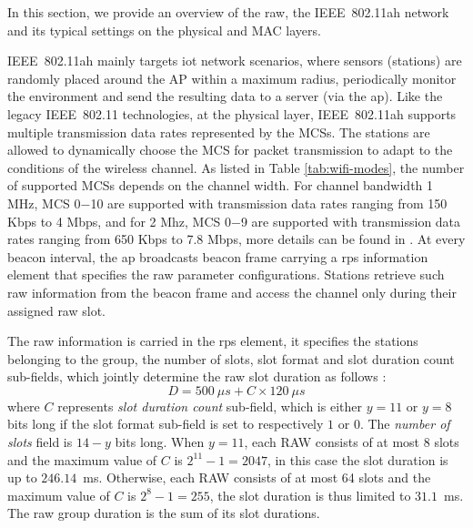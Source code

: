 In this section, we provide an overview of the \gls{raw}, the IEEE~802.11ah network and its typical settings on the physical and MAC layers. 



IEEE~802.11ah mainly targets \gls{iot} network scenarios, where sensors (stations) are randomly placed around the AP within a maximum radius, periodically monitor the environment and send the resulting data to a server (via the \gls{ap}). Like the legacy IEEE~802.11 technologies, at the physical layer, IEEE~802.11ah supports multiple transmission data rates represented by the MCSs. The stations are allowed to dynamically choose the MCS for packet transmission to adapt to the conditions of the wireless channel. As listed in Table \ref{tab:wifi-modes}, the number of supported MCSs depends on the channel width. For channel bandwidth 1 MHz,  MCS 0$-$10 are supported with transmission data rates ranging from 150 Kbps to 4 Mbps, and for 2 Mhz, MCS 0$-$9 are supported with transmission data rates ranging from 650 Kbps to 7.8 Mbps, more details can be found in \cite{80211ahStd}. At every beacon interval, the \gls{ap} broadcasts beacon frame carrying a \gls{rps} information element that specifies the \gls{raw} parameter configurations. Stations retrieve such \gls{raw} information from the beacon frame and access the channel only during their assigned \gls{raw} slot. 


The \gls{raw} information is carried in the \gls{rps} element, it specifies the stations belonging to the group, the number of slots, slot format and slot duration count sub-fields, which jointly determine the \gls{raw} slot duration as follows \cite{80211ahStd}: 
\begin{equation} \label{eq:Duration}
D = 500~\mu{}s + C \times 120~\mu{}s  
\end{equation}
where $C$ represents \textit{slot duration count} sub-field, which is either $y = 11$ or $y = 8$ bits long if the slot format sub-field is set to respectively $1$ or $0$. The \textit{number of slots} field is $14-y$ bits long. When $y = 11$, each RAW consists of at most 8 slots and the maximum value of $C$ is $2^{11}-1=2047$, in this case the slot duration is up to $246.14$~ms. Otherwise, each RAW consists of at most 64 slots and the maximum value of $C$ is $2^{8}-1=255$, the slot duration is thus limited to $31.1$~ms. The \gls{raw} group duration is the sum of its slot durations.



